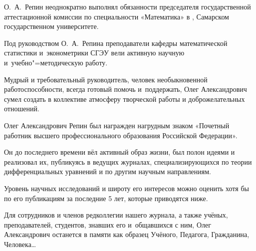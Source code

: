 О.~А.~Репин  неоднократно выполнял обязанности председателя государственной аттестационной комиссии по специальности «Математика» в , Самарском государственном университете. 



Под руководством О.~А.~Репина преподаватели кафедры математической статистики и~эконометрики СГЭУ вели активную научную и~учебно"=методическую работу. 

Мудрый и требовательный руководитель, человек необыкновенной работоспособности, всегда готовый помочь и~поддержать, Олег Александрович сумел создать в коллективе атмосферу творческой работы и доброжелательных отношений.






Олег Александрович Репин был награжден нагрудным знаком «Почетный работник высшего профессионального образования Российской Федерации».



Он до последнего времени вёл активный образ жизни, был полон идеями и реализовал их, публикуясь в ведущих журналах, специализирующихся по теории дифференциальных уравнений и по другим научным направлениям. 

Уровень научных исследований и широту его интересов можно оценить хотя бы по его публикациям за последние 5 лет, которые приводятся ниже.



Для сотрудников и членов редколлегии нашего журнала, а также учёных, преподавателей, студентов, знавших его и~общавшихся с ним, Олег Александрович останется в памяти как образец Учёного, Педагога, Гражданина, Человека\dots





\smallskip



\renewcommand{\baselinestretch}{0.85}



\PersonRadRef



